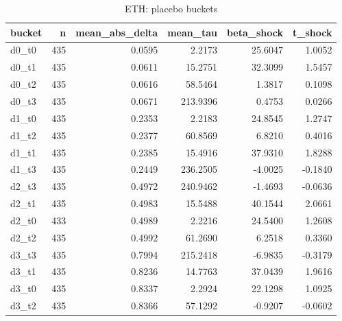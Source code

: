 \begin{table}
\caption{ETH: placebo buckets}
\label{tab:t7_placebo_buckets_ETH}
\begin{tabular}{lrrrrr}
\toprule
bucket & n & mean\_abs\_delta & mean\_tau & beta\_shock & t\_shock \\
\midrule
d0\_t0 & 435 & 0.0595 & 2.2173 & 25.6047 & 1.0052 \\
d0\_t1 & 435 & 0.0611 & 15.2751 & 32.3099 & 1.5457 \\
d0\_t2 & 435 & 0.0616 & 58.5464 & 1.3817 & 0.1098 \\
d0\_t3 & 435 & 0.0671 & 213.9396 & 0.4753 & 0.0266 \\
d1\_t0 & 435 & 0.2353 & 2.2183 & 24.8545 & 1.2747 \\
d1\_t2 & 435 & 0.2377 & 60.8569 & 6.8210 & 0.4016 \\
d1\_t1 & 435 & 0.2385 & 15.4916 & 37.9310 & 1.8288 \\
d1\_t3 & 435 & 0.2449 & 236.2505 & -4.0025 & -0.1840 \\
d2\_t3 & 435 & 0.4972 & 240.9462 & -1.4693 & -0.0636 \\
d2\_t1 & 435 & 0.4983 & 15.5488 & 40.1544 & 2.0661 \\
d2\_t0 & 433 & 0.4989 & 2.2216 & 24.5400 & 1.2608 \\
d2\_t2 & 435 & 0.4992 & 61.2690 & 6.2518 & 0.3360 \\
d3\_t3 & 435 & 0.7994 & 215.2418 & -6.9835 & -0.3179 \\
d3\_t1 & 435 & 0.8236 & 14.7763 & 37.0439 & 1.9616 \\
d3\_t0 & 435 & 0.8337 & 2.2924 & 22.1298 & 1.0925 \\
d3\_t2 & 435 & 0.8366 & 57.1292 & -0.9207 & -0.0602 \\
\bottomrule
\end{tabular}
\end{table}
